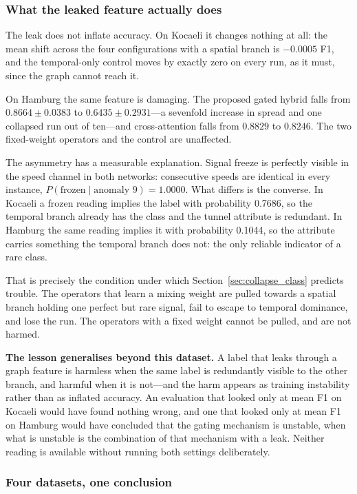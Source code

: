 \documentclass[journal]{IEEEtran}
\begin{document}
\subsubsection{What the leaked feature actually does}
The leak does not inflate accuracy. On Kocaeli it changes nothing at all: the
mean shift across the four configurations with a spatial branch is $-0.0005$
F1, and the temporal-only control moves by exactly zero on every run, as it
must, since the graph cannot reach it.

On Hamburg the same feature is damaging. The proposed gated hybrid falls from
$0.8664 \pm 0.0383$ to $0.6435 \pm 0.2931$---a sevenfold increase in spread
and one collapsed run out of ten---and cross-attention falls from $0.8829$ to
$0.8246$. The two fixed-weight operators and the control are unaffected.

The asymmetry has a measurable explanation. Signal freeze is perfectly visible
in the speed channel in both networks: consecutive speeds are identical in
every instance, $P(\text{frozen} \mid \text{anomaly }9) = 1.0000$. What
differs is the converse. In Kocaeli a frozen reading implies the label with
probability 0.7686, so the temporal branch already
has the class and the tunnel attribute is redundant. In Hamburg the same
reading implies it with probability 0.1044, so the attribute
carries something the temporal branch does not: the only reliable indicator of
a rare class.

That is precisely the condition under which
Section~\ref{sec:collapse_class} predicts trouble. The operators that learn a
mixing weight are pulled towards a spatial branch holding one perfect but rare
signal, fail to escape to temporal dominance, and lose the run. The operators
with a fixed weight cannot be pulled, and are not harmed.

\textbf{The lesson generalises beyond this dataset.} A label that leaks
through a graph feature is harmless when the same label is redundantly visible
to the other branch, and harmful when it is not---and the harm appears as
training instability rather than as inflated accuracy. An evaluation that
looked only at mean F1 on Kocaeli would have found nothing wrong, and one that
looked only at mean F1 on Hamburg would have concluded that the gating
mechanism is unstable, when what is unstable is the combination of that
mechanism with a leak. Neither reading is available without running both
settings deliberately.

\subsubsection{Four datasets, one conclusion}
\label{sec:four_datasets}
\end{document}
